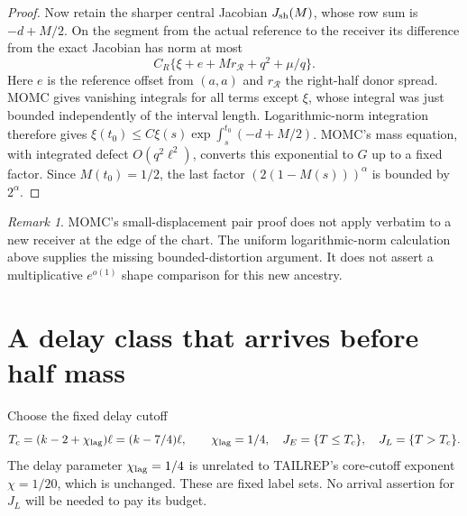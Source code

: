\documentclass[11pt]{article}
\theoremstyle{remark}\newtheorem{remark}[theorem]{Remark}
\newcommand{\Rhalf}{\mathcal R}
\begin{document}
\begin{proof}
Now retain the sharper central Jacobian
$J_{\rm sh}(M)$, whose row sum is $-d+M/2$. On the segment from
the actual reference to the receiver its difference from the exact
Jacobian has norm at most
\[
 C_R\{\xi+e+M r_{\Rhalf}+q^2+\mu/q\}.
\]
Here $e$ is the reference offset from $(a,a)$ and $r_{\Rhalf}$ the
right-half donor spread. MOMC gives vanishing integrals for all
terms except $\xi$, whose integral was just bounded independently
of the interval length. Logarithmic-norm integration therefore gives
$\xi(t_0)\le C\xi(s)\exp\int_s^{t_0}(-d+M/2)$.
MOMC's mass equation, with integrated defect $O(q^2\ell^2)$, converts
this exponential to $G$ up to a fixed factor. Since $M(t_0)=1/2$,
the last factor $(2(1-M(s)))^\alpha$ is bounded by $2^\alpha$.
\end{proof}

\begin{remark}
MOMC's small-displacement pair proof does not apply verbatim to a
new receiver at the edge of the chart. The uniform logarithmic-norm
calculation above supplies the missing bounded-distortion argument.
It does not assert a multiplicative $e^{o(1)}$ shape comparison for
this new ancestry.
\end{remark}

\section{A delay class that arrives before half mass}
Choose the fixed delay cutoff
\begin{equation}
 T_c=(k-2+\chi_{\rm lag})\ell=(k-7/4)\ell,\qquad \chi_{\rm lag}=1/4,
 \quad J_E=\{T\le T_c\},\quad J_L=\{T>T_c\}.
 \label{an03lsbv1:split}
\end{equation}
The delay parameter $\chi_{\rm lag}=1/4$ is unrelated to TAILREP's
core-cutoff exponent $\chi=1/20$, which is unchanged.
These are fixed label sets. No arrival assertion for $J_L$ will be
needed to pay its budget.
\end{document}
